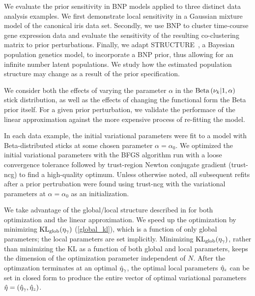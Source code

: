 We evaluate the prior sensitivity in BNP models applied to three distinct data analysis examples.
We first demonstrate local sensitivity in a Gaussian mixture model of the canonical iris data set.
Secondly, we use BNP to cluster time-course gene expression data
and evaluate the sensitivity of the resulting co-clustering matrix to prior perturbations.
Finally, we adapt STRUCTURE~\citep{pritchard:2000:structure}, a Bayesian population genetics model,
to incorporate a BNP prior, thus allowing for
an infinite number latent populations.
We study how the estimated population structure may change as a
result of the prior specification.

We consider both the effects of varying the parameter $\alpha$
in the $\mathrm{Beta}\left(\nu_{k} \vert 1, \alpha\right)$ stick distribution, as well as
the effects of changing the functional form the Beta prior itself.
For a given prior perturbation,
we validate the performace of the linear approximation against
the more expensive process of re-fitting the model.

In each data example,
the initial variational parameters were fit to a model
with Beta-distributed sticks at some chosen parameter $\alpha = \alpha_0$.
We optimized the initial variational parameters with
the BFGS algorithm run with a loose convergence tolerance
followed by trust-region Newton conjugate gradient (trust-ncg) to find a high-quality optimum.
Unless otherwise noted, all subsequent refits after a prior pertrubation were found
using trust-ncg with the variational parameters at $\alpha = \alpha_0$ as an initialization.

We take advantage of the global/local structure described in 
for both optimization and the
linear approximation.
We speed up the optimization by minimizing $\mathrm{KL}_{\mathrm{glob}}(\eta_{\gamma})$ (\eqref{global_kl}),
which is a function of only global parameters; the local parameters are set implicitly.
Minimizing $\mathrm{KL}_{\mathrm{glob}}(\eta_{\gamma})$, rather than minimizing the $\mathrm{KL}$ as a function of
both global and local parameters, keeps the
dimension of the optimization parameter independent of $N$.
After the optimzation terminates at an optimal $\hat\eta_{\gamma}$,
the optimal local parameters $\hat\eta_{z}$ can be set in closed form
to produce the entire vector of optimal variational parameters $\hat\eta = (\hat\eta_{\gamma}, \hat\eta_{z})$.

